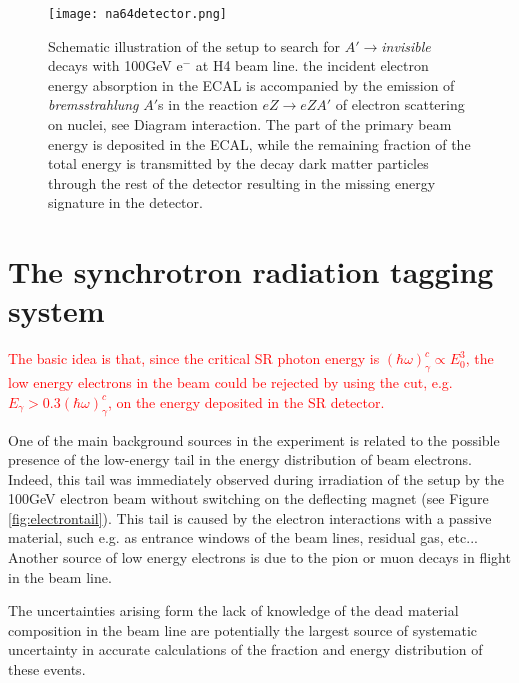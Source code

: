 \begin{figure}[ht]
		\hspace*{\fill}
		\centering
		\texttt{[image: na64detector.png]}
		\captionsetup{margin=1cm}
		\caption{Schematic illustration of the setup to search for $A'\rightarrow${\it invisible} decays with 100GeV e$^-$
		at H4 beam line. the incident electron energy absorption in the ECAL is accompanied by the emission of
		{\it bremsstrahlung} $A'$s in the reaction $eZ\rightarrow eZA'$ of electron scattering on nuclei, see Diagram
		interaction. The part of the primary beam energy is deposited in the ECAL, while the remaining fraction of the total
		energy is transmitted by the decay dark matter particles through the rest of the detector resulting in the missing
		energy signature in the detector.}\label{fig:na64detector}
\end{figure}





\section{The synchrotron radiation tagging system}
\textcolor{red}{The basic idea is that, since the critical SR photon energy is $(\hbar
\omega)_{\gamma}^c \propto E_0^3$, the low energy electrons in the beam could be rejected by using the cut, e.g.
$E_{\gamma}>0.3(\hbar\omega)_{\gamma}^c$, on the energy deposited in the SR detector. }

One of the main background sources in the experiment is related to the possible presence of the low-energy tail in the
energy distribution of beam electrons. Indeed, this tail was immediately observed during irradiation of the setup by the
100GeV electron beam without switching on the deflecting magnet (see Figure \ref{fig:electrontail}). This tail is caused
by the electron interactions with a passive material, such e.g. as entrance windows of the beam lines, residual gas,
etc... Another source of low energy electrons is due to the pion or muon decays in flight in the beam line.\par

The uncertainties arising form the lack of knowledge of the dead material composition in the beam line are potentially
the largest source of systematic uncertainty in accurate calculations of the fraction and energy distribution of these
events.\par

